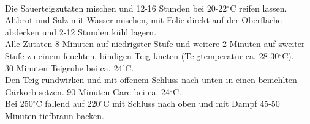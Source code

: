 \paragraph{}
Die Sauerteigzutaten mischen und 12-16 Stunden bei 20-22$^\circ$C reifen lassen.\\
Altbrot und Salz mit Wasser mischen, mit Folie direkt auf der Oberfläche abdecken und 2-12 Stunden kühl lagern.\\
Alle Zutaten 8 Minuten auf niedrigster Stufe und weitere 2 Minuten auf zweiter Stufe zu einem feuchten, bindigen Teig kneten (Teigtemperatur ca. 28-30$^\circ$C).\\
30 Minuten Teigruhe bei ca. 24$^\circ$C.\\
Den Teig rundwirken und mit offenem Schluss nach unten in einen bemehlten Gärkorb setzen.
90 Minuten Gare bei ca. 24$^\circ$C.\\
Bei 250$^\circ$C fallend auf 220$^\circ$C mit Schluss nach oben und mit Dampf 45-50 Minuten tiefbraun backen.
\pagebreak


